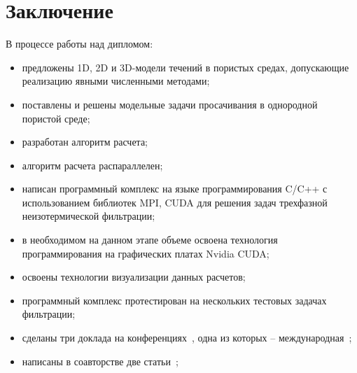 \section{Заключение}

В процессе работы над дипломом:

\begin{itemize}
	\item 	предложены 1D, 2D и 3D-модели течений в пористых средах,
	допускающие реализацию явными численными методами;

	\item поставлены и решены модельные задачи просачивания в однородной 
	пористой среде;

	\item разработан алгоритм расчета;
	
	\item алгоритм расчета распараллелен;
	
	\item написан программный комплекс на языке программирования C/C++ с использованием 
	библиотек MPI, CUDA для решения задач трехфазной неизотермической фильтрации;
	
	\item в необходимом на данном этапе объеме освоена технология 
	программирования на графических платах Nvidia CUDA;

	\item освоены технологии визуализации данных расчетов;

	\item программный комплекс протестирован на нескольких тестовых задачах 
	фильтрации;
	
	\item сделаны три доклада на конференциях~, одна из которых -- международная~;

	\item написаны в соавторстве две статьи~;
\end{itemize}
